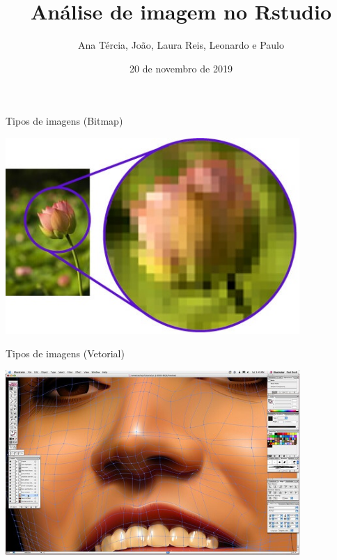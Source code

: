 \documentclass[
  ignorenonframetext,
]{beamer}
\title{Análise de imagem no Rstudio}
\author{Ana Tércia, João, Laura Reis, Leonardo e Paulo}
\date{20 de novembro de 2019}
\begin{document}
\frame{\titlepage}

\begin{frame}{Tipos de imagens (Bitmap)}
\protect\hypertarget{tipos-de-imagens-bitmap}{}

\small

\includegraphics[width=4.4in]{IMAGENS/BITMAP}

\begin{center}
\tiny{}
\end{center}

\end{frame}

\begin{frame}{Tipos de imagens (Vetorial)}
\protect\hypertarget{tipos-de-imagens-vetorial}{}

\small

\includegraphics[width=4.4in]{IMAGENS/VETORIAL}

\begin{center}
\tiny{}
\end{center}

\end{frame}
\end{document}
